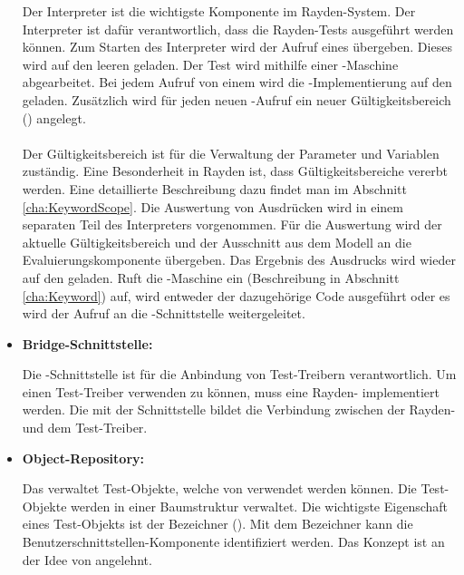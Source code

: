 \begin{itemize}
Der Interpreter ist die wichtigste Komponente im Rayden-System. Der Interpreter ist dafür verantwortlich, dass die Rayden-Tests ausgeführt werden können. Zum Starten des Interpreter wird der Aufruf eines  übergeben. Dieses  wird auf den leeren  geladen. Der Test wird mithilfe einer -Maschine\cite{StackMachine} abgearbeitet. Bei jedem Aufruf von einem  wird die -Implementierung auf den  geladen. Zusätzlich wird für jeden neuen -Aufruf ein neuer Gültigkeitsbereich () angelegt. \\
\\
Der Gültigkeitsbereich ist für die Verwaltung der Parameter und Variablen zuständig. Eine Besonderheit in Rayden ist, dass Gültigkeitsbereiche vererbt werden. Eine detaillierte Beschreibung dazu findet man im Abschnitt \ref{cha:KeywordScope}. Die Auswertung von Ausdrücken wird in einem separaten Teil des Interpreters vorgenommen. Für die Auswertung wird der aktuelle Gültigkeitsbereich und der Ausschnitt aus dem Modell an die Evaluierungskomponente übergeben. Das Ergebnis des Ausdrucks wird wieder auf den  geladen. Ruft die -Maschine ein  (Beschreibung in Abschnitt \ref{cha:Keyword}) auf, wird entweder der dazugehörige Code ausgeführt oder es wird der Aufruf an die -Schnittstelle weitergeleitet.\\

\item \textbf{Bridge-Schnittstelle:}

Die -Schnittstelle ist für die Anbindung von Test-Treibern verantwortlich. Um einen Test-Treiber verwenden zu können, muss eine Rayden- implementiert werden. Die  mit der Schnittstelle bildet die Verbindung zwischen der Rayden- und dem Test-Treiber.\\

\item \textbf{Object-Repository:}

Das  verwaltet Test-Objekte, welche von  verwendet werden können. Die Test-Objekte werden in einer Baumstruktur verwaltet. Die wichtigste Eigenschaft eines Test-Objekts ist der Bezeichner (). Mit dem Bezeichner kann die Benutzerschnittstellen-Komponente identifiziert werden. Das Konzept ist an der Idee von \cite{PageObject} angelehnt. \\

\end{itemize}


